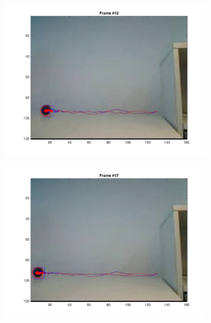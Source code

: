 \documentclass{ethz_report}
\begin{document}
\begin{figure}[h]
\begin{subfigure}[b]{.25\textwidth}
        \includegraphics[width=1\linewidth]{images/video3_noise_low_41}
    \end{subfigure}%
    \begin{subfigure}[b]{.25\textwidth}
        \centering
        \includegraphics[width=1\linewidth]{images/video3_noise_low_46}
    \end{subfigure}%
    \begin{subfigure}[b]{.25\textwidth}
        \centering

\end{subfigure}
\end{figure}
\end{document}

